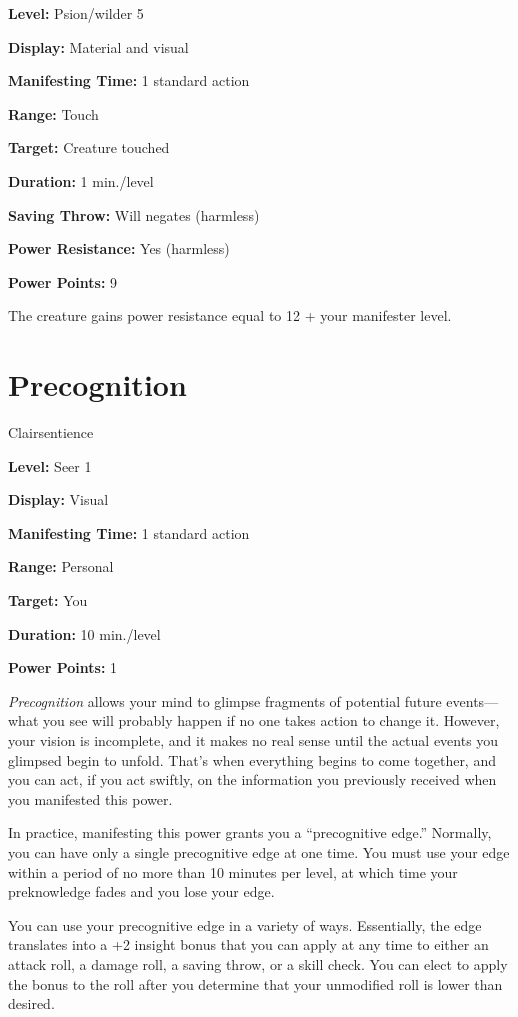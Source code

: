 \documentclass{article}
\begin{document}
\textbf{Level:} Psion/wilder 5

\textbf{Display:} Material and visual

\textbf{Manifesting Time:} 1 standard action

\textbf{Range:} Touch

\textbf{Target:} Creature touched

\textbf{Duration:} 1 min./level

\textbf{Saving Throw:} Will negates (harmless)

\textbf{Power Resistance:} Yes (harmless)

\textbf{Power Points:} 9

The creature gains power resistance equal to 12 + your manifester level. 

\vspace{12pt}
\section*{Precognition}

Clairsentience

\textbf{Level:} Seer 1

\textbf{Display:} Visual

\textbf{Manifesting Time:} 1 standard action

\textbf{Range:} Personal

\textbf{Target:} You

\textbf{Duration:} 10 min./level

\textbf{Power Points:} 1

\textit{Precognition }allows your mind to glimpse fragments of potential future 
events---what you see will probably happen if no one takes action to change it. 
However, your vision is incomplete, and it makes no real sense until the actual 
events you glimpsed begin to unfold. That's when everything begins to come together, 
and you can act, if you act swiftly, on the information you previously received 
when you manifested this power. 

In practice, manifesting this power grants you a ``precognitive edge.'' Normally, 
you can have only a single precognitive edge at one time. You must use your edge 
within a period of no more than 10 minutes per level, at which time your preknowledge 
fades and you lose your edge.

You can use your precognitive edge in a variety of ways. Essentially, the edge 
translates into a +2 insight bonus that you can apply at any time to either an 
attack roll, a damage roll, a saving throw, or a skill check. You can elect to 
apply the bonus to the roll after you determine that your unmodified roll is lower 
than desired.
\end{document}
